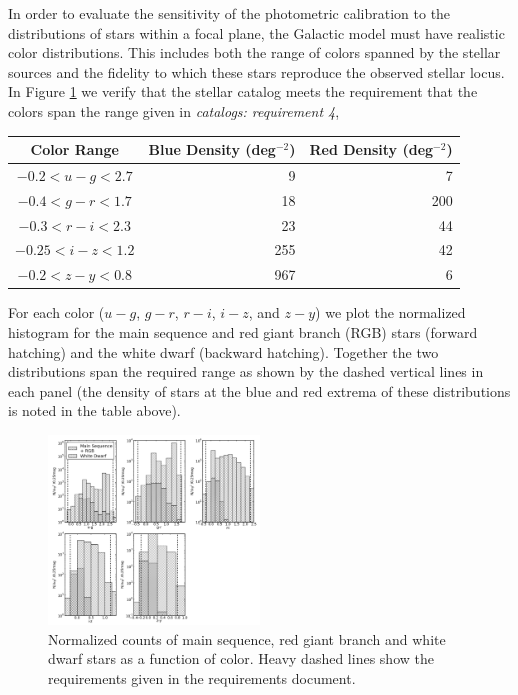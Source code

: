 \documentclass[11pt]{article}
\begin{document}
In order to evaluate the sensitivity of the photometric calibration to
the distributions of stars within a focal plane, the Galactic model
must have realistic color distributions.  This includes both the range
of colors spanned by the stellar sources and the fidelity to which
these stars reproduce the observed stellar locus. In Figure
\ref{fig:starcolorspan} we verify that the stellar catalog meets the
requirement that the colors span the range given in {\it catalogs:
  requirement 4},
\begin{center}
\begin{tabular}{c|r|r}
  Color Range& Blue Density (deg$^{-2}$) & Red Density (deg$^{-2}$)\\
\hline
  $ -0.2 < u-g <        2.7 $&9&7\\
  $  -0.4  <  g-r <       1.7 $&18&200\\
  $ -0.3   <  r-i <    2.3 $&23&44\\
  $  -0.25 < i-z <       1.2 $&255&42\\ 
  $  -0.2 <  z-y   <    0.8 $&967&6
\end{tabular}
\end{center}
For each color ($u-g$, $g-r$, $r-i$, $i-z$, and $z-y$) we plot the
normalized histogram for the main sequence and red giant branch (RGB)
stars (forward hatching) and the white dwarf (backward hatching).
Together the two distributions span the required range as shown by the
dashed vertical lines in each panel (the density of stars at the blue
and red extrema of these distributions is noted in the table above). 
\begin{figure}[h]
\centering
\includegraphics[width=0.5\textwidth]{validation_figures/star_lsst_color_hist.png}
\caption{Normalized counts of main sequence, red giant branch and white dwarf stars as a function of color.  Heavy dashed lines show the requirements given in the requirements document.\label{fig:starcolorspan}}
\end{figure}
\end{document}
